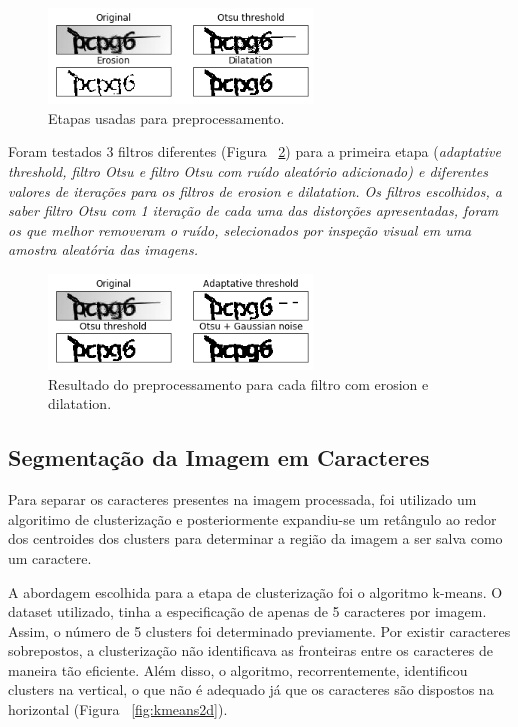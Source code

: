 \documentclass[11pt]{article}
\begin{document}
  \begin{figure}[H]
        {\centering
        \includegraphics[width=70mm]{images/preproc.png}
        \caption{Etapas usadas para preprocessamento.}
        \label{fig:preproc}\par}
  \end{figure}

Foram testados 3 filtros diferentes (Figura ~\ref{fig:filters}) para a primeira etapa (\em adaptative threshold\em , filtro Otsu e filtro Otsu com ruído aleatório adicionado) e diferentes valores de iterações para os filtros de \em erosion \em e \em dilatation\em . Os filtros escolhidos, a saber filtro Otsu com 1 iteração de cada uma das distorções apresentadas, foram os que melhor removeram o ruído, selecionados por inspeção visual em uma amostra aleatória das imagens.

  \begin{figure}[H]
        {\centering
        \includegraphics[width=70mm]{images/filters.png}
        \caption{Resultado do preprocessamento para cada filtro com erosion e dilatation.}
        \label{fig:filters}\par}
  \end{figure}


\subsection{Segmentação da Imagem em Caracteres}
\label{sec:cluteri}

Para separar os caracteres presentes na imagem processada, foi utilizado um algoritimo de clusterização e posteriormente expandiu-se um retângulo ao redor dos centroides dos clusters para determinar a região da imagem a ser salva como um caractere.

A abordagem escolhida para a etapa de clusterização foi o algoritmo k-means. O dataset utilizado, tinha a especificação de apenas de 5 caracteres por imagem. Assim, o número de 5 clusters foi determinado previamente. Por existir caracteres sobrepostos, a clusterização não identificava as fronteiras entre os caracteres de maneira tão eficiente. Além disso, o algoritmo, recorrentemente, identificou clusters na vertical, o que não é adequado já que os caracteres são dispostos na horizontal (Figura ~\ref{fig:kmeans2d}). 
\end{document}
